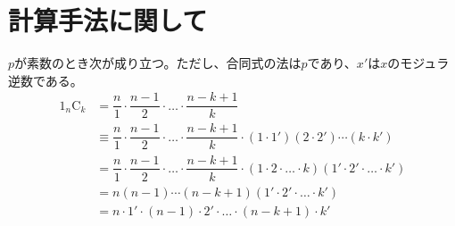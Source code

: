 \documentclass{article}
\newcommand{\combination}[2]{{}_{#1} \mathrm{C}_{#2}}
\begin{document}
\section{計算手法に関して}

$p$が素数のとき次が成り立つ。ただし、合同式の法は$p$であり、$x'$は$x$のモジュラ逆数である。
\begin{alignat}{1}
    \combination{n}{k}
    &= \dfrac{n}{1} \cdot \dfrac{n - 1}{2} \cdot \dots \cdot \dfrac{n - k + 1}{k} \\
    &\equiv
        \dfrac{n}{1} \cdot \dfrac{n - 1}{2} \cdot \dots \cdot \dfrac{n - k + 1}{k}
        \cdot (1 \cdot 1') (2 \cdot 2') \cdots (k \cdot k') \\
    &=
        \dfrac{n}{1} \cdot \dfrac{n - 1}{2} \cdot \dots \cdot \dfrac{n - k + 1}{k}
        \cdot (1 \cdot 2 \cdot \dots \cdot k)(1' \cdot 2' \cdot \dots \cdot k') \\
    &=
        n (n - 1) \cdots (n - k + 1)
        (1' \cdot 2' \cdot \dots \cdot k') \\
    &=
        n \cdot 1' \cdot (n - 1) \cdot 2' \cdot \dots \cdot (n - k + 1) \cdot k' \\
\end{alignat}
\end{document}
